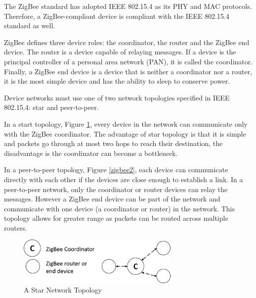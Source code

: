 The ZigBee standard has adopted \ac{IEEE} 802.15.4 as its \ac{PHY} and \ac{MAC} protocols. Therefore, a ZigBee-compliant device is compliant with the \ac{IEEE} 802.15.4 standard as well. 

ZigBee defines three device roles: the coordinator, the router and the ZigBee end device. The router is a device capable of relaying messages. If a device is the principal controller of a personal area network (PAN), it is called the coordinator. Finally, a ZigBee end device is a device that is neither a coordinator nor a router, it is the most simple device and has the ability to sleep to conserve power.




Device networks must use one of two network topologies specified in \ac{IEEE} 802.15.4: star and peer-to-peer. 

In a start topology, Figure \ref{zigbee1}, every device in the network can communicate only with the ZigBee coordinator. The advantage of star topology is that it is simple and packets go through at most two hops to reach their destination, the disadvantage is the coordinator can become a bottleneck.

In a peer-to-peer topology, Figure \ref{zigbee2}, each device can communicate directly with each other if the devices are close enough to establish a link. In a peer-to-peer network, only the coordinator or router devices can relay the messages. However a ZigBee end device can be part of the network and communicate with one device (a coordinator or router) in the network. This topology allows for greater range as packets can be routed across multiple routers.


\begin{figure}[h]
\centering
\includegraphics[width=0.7\textwidth]{Figures/zigbee1}
\caption{A Star Network Topology}
\label{zigbee1}
\end{figure}

